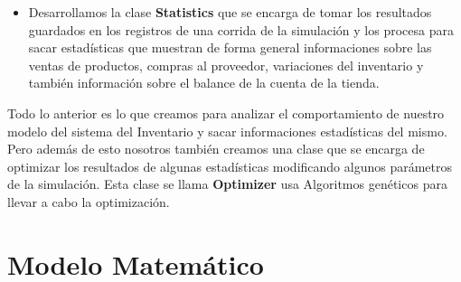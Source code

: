 \documentclass{article}
\begin{document}
\begin{itemize}
    \item Desarrollamos la clase \textbf{Statistics} que se encarga de tomar los resultados guardados en los registros de una corrida de la simulación y los procesa para sacar estadísticas que muestran de forma general informaciones sobre las ventas de productos, compras al proveedor, variaciones del inventario y también información sobre el balance de la cuenta de la tienda.
\end{itemize}

Todo lo anterior es lo que creamos para analizar el comportamiento de nuestro modelo del sistema del Inventario y sacar informaciones estadísticas del mismo. Pero además de esto nosotros también creamos una clase que se encarga de optimizar los resultados de algunas estadísticas modificando algunos parámetros de la simulación. Esta clase se llama \textbf{Optimizer} usa Algoritmos genéticos
para llevar a cabo la optimización.

\section{Modelo Matemático}
\end{document}
